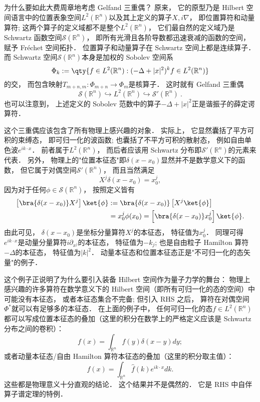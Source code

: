     为什么要如此大费周章地考虑 Gelfand 三重偶？ 原来， 它的原型乃是 Hilbert 空间语言中的位置表象空间$L^2(\mathbb{R}^n)$以及其上定义的算子$X,i\nabla$， 即位置算符和动量算符; 这两个算子的定义域都不是整个$L^2(\mathbb{R}^n)$， 它们最自然的定义域乃是 Schwartz 函数空间$\mathcal{S}(\mathbb{R}^n)$， 即所有光滑且各阶导数都迅速衰减的函数的空间， 赋予 Fréchet 空间拓扑． 位置算子和动量算子在 Schwartz 空间上都是连续算子． 而 Schwartz 空间$\mathcal{S}(\mathbb{R}^n)$本身是加权的 Sobolev 空间系
$$
\Phi_k := \qty{f \in L^2 (\mathbb{R}^n): (-\Delta + |x|^ 2)^{k} f \in L^2 (\mathbb{R}^n) }
$$
的交， 而包含映射$T_{m+n,m}:\Phi_{m+n}\to\Phi_m$是核算子． 这时就有 Gelfand 三重偶$$
\mathcal{S}(\mathbb{R}^n)\hookrightarrow L^2(\mathbb{R}^n)\hookrightarrow \mathcal{S}'(\mathbb{R}^n)~.
$$也可以注意到， 上述定义的 Sobolev 范数中的算子$-\Delta+|x|^2$正是谐振子的薛定谔算符．

    这个三重偶应该包含了所有物理上感兴趣的对象． 实际上， 它显然囊括了平方可积的束缚态， 即可归一化的波函数; 也囊括了不平方可积的散射态， 例如自由单色波$e^{ik\cdot x}$． 前者属于$L^2(\mathbb{R}^n)$， 而后者应该用 Schwartz 分布即$\mathcal{S}'(\mathbb{R}^n)$的元素来代表． 另外， 物理上的"位置本征态"即$\delta(x-x_0)$显然并不是数学意义下的函数， 但它属于对偶空间$\mathcal{S}'(\mathbb{R}^n)$， 而且当然满足
$$
X^j\delta(x-x_0)=x_0^j,
$$
因为对于任何$\phi\in\mathcal{S}(\mathbb{R}^n)$， 按照定义皆有
$$
\begin{aligned}
\left[\bra{\delta(x-x_0)}X^j\right]\ket{\phi}
&:=\bra{\delta(x-x_0)}\left[X^j\ket{\phi}\right]\\
&=x_0^j\phi(x_0)
=\left[\bra{\delta(x-x_0)}x_0^j\right]\ket{\phi}.
\end{aligned}
$$
由此可见， $\delta(x-x_0)$是坐标分量算符$X^j$的本征态， 特征值为$x_0^j$． 同理可得$e^{ik\cdot x}$是动量分量算符$i\partial_{x^j}$的本征态， 特征值为$-k_j$; 也是自由粒子 Hamilton 算符$-\Delta$的本征态， 特征值为$|k|^2$． 动量本征态和位置本征态正是"不可归一化的态矢量"的例子． 

    这个例子正说明了为什么要引入装备 Hilbert 空间作为量子力学的舞台： 物理上感兴趣的许多算符在数学意义下的 Hilbert 空间（即所有可归一化的态的空间）中可能没有本征态， 或者本征态集合不完备; 但引入 RHS 之后， 算符在对偶空间$\Phi^*$就可以有足够多的本征态． 在上面的例子中， 任何可归一化的态$f\in{L^2}(\mathbb{R}^n)$都可以写成位置本征态的叠加（这里的积分在数学上的严格定义应该是 Schwartz 分布之间的卷积）：
$$
f(x)=\int_{\mathbb{R}^n}f(y)\delta(x-y)dy;
$$    
或者动量本征态/自由 Hamilton 算符本征态的叠加（这里的积分取主值）：
$$
f(x)=\int_{\mathbb{R}^n}\hat f(k)e^{ik\cdot x}dk.
$$
这些都是物理意义十分直观的结论． 这个结果并不是偶然的． 它是 RHS 中自伴算子谱定理的特例．
